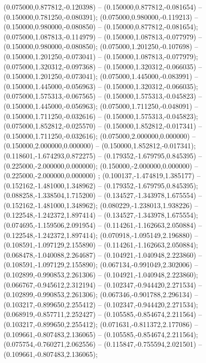  (0.075000,0.877812,-0.120398) -- (0.150000,0.877812,-0.081654) -- (0.150000,0.781250,-0.080391);
 (0.075000,0.980000,-0.119213) -- (0.150000,0.980000,-0.080850) -- (0.150000,0.877812,-0.081654);
 (0.075000,1.087813,-0.114979) -- (0.150000,1.087813,-0.077979) -- (0.150000,0.980000,-0.080850);
 (0.075000,1.201250,-0.107698) -- (0.150000,1.201250,-0.073041) -- (0.150000,1.087813,-0.077979);
 (0.075000,1.320312,-0.097368) -- (0.150000,1.320312,-0.066035) -- (0.150000,1.201250,-0.073041);
 (0.075000,1.445000,-0.083991) -- (0.150000,1.445000,-0.056963) -- (0.150000,1.320312,-0.066035);
 (0.075000,1.575313,-0.067565) -- (0.150000,1.575313,-0.045823) -- (0.150000,1.445000,-0.056963);
 (0.075000,1.711250,-0.048091) -- (0.150000,1.711250,-0.032616) -- (0.150000,1.575313,-0.045823);
 (0.075000,1.852812,-0.025570) -- (0.150000,1.852812,-0.017341) -- (0.150000,1.711250,-0.032616);
 (0.075000,2.000000,0.000000) -- (0.150000,2.000000,0.000000) -- (0.150000,1.852812,-0.017341);
 (0.118601,-1.674293,0.872275) -- (0.179352,-1.679795,0.845395) -- (0.225000,-2.000000,0.000000);
 (0.150000,-2.000000,0.000000) -- (0.225000,-2.000000,0.000000) ;
 (0.100137,-1.474819,1.385177) -- (0.152162,-1.481000,1.348962) -- (0.179352,-1.679795,0.845395);
 (0.088258,-1.338504,1.715200) -- (0.134527,-1.343978,1.675554) -- (0.152162,-1.481000,1.348962);
 (0.080229,-1.238013,1.938226) -- (0.122548,-1.242372,1.897414) -- (0.134527,-1.343978,1.675554);
 (0.074695,-1.159506,2.091954) -- (0.114261,-1.162663,2.050884) -- (0.122548,-1.242372,1.897414);
 (0.070918,-1.095149,2.196880) -- (0.108591,-1.097129,2.155890) -- (0.114261,-1.162663,2.050884);
 (0.068478,-1.040088,2.264687) -- (0.104921,-1.040948,2.223860) -- (0.108591,-1.097129,2.155890);
 (0.067134,-0.991049,2.302006) -- (0.102899,-0.990853,2.261306) -- (0.104921,-1.040948,2.223860);
 (0.066767,-0.945612,2.312194) -- (0.102347,-0.944420,2.271534) -- (0.102899,-0.990853,2.261306);
 (0.067346,-0.901788,2.296134) -- (0.103217,-0.899650,2.255412) -- (0.102347,-0.944420,2.271534);
 (0.068919,-0.857711,2.252427) -- (0.105585,-0.854674,2.211564) -- (0.103217,-0.899650,2.255412);
 (0.071631,-0.811372,2.177086) -- (0.109661,-0.807483,2.136065) -- (0.105585,-0.854674,2.211564);
 (0.075754,-0.760271,2.062556) -- (0.115847,-0.755594,2.021501) -- (0.109661,-0.807483,2.136065);
